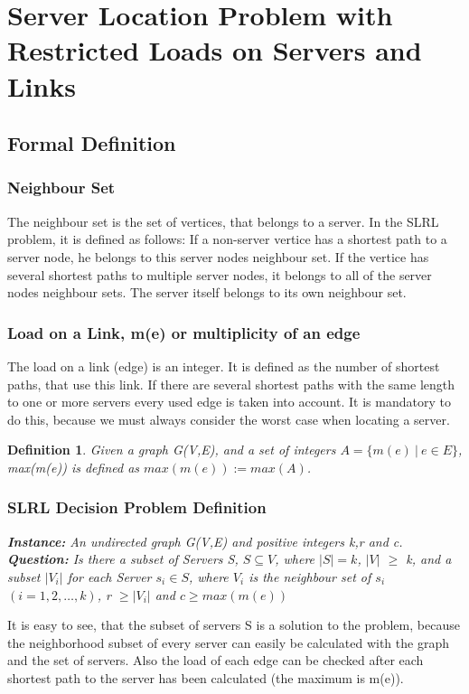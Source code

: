 \documentclass [12pt]{article}
\newtheorem{mydef}{Definition}
\begin{document}
\section{Server Location Problem with Restricted Loads on Servers and Links}
\subsection{Formal Definition}
\subsubsection{Neighbour Set}
The neighbour set is the set of vertices, that belongs to a server. In the SLRL problem, it is
defined as follows: If a non-server vertice has a shortest path to a server node, he 
belongs to this server nodes neighbour set. If the vertice has several shortest
paths to multiple server nodes, it belongs to all of the server nodes neighbour
sets. The server itself belongs to its own neighbour set.
\subsubsection{Load on a Link, m(e) or multiplicity of an edge}
The load on a link (edge) is an integer. It is defined as the number of shortest paths, that use this link. If there
are several shortest paths with the same length to one or more servers every
used edge is taken into account. It is mandatory to do this, because we must always consider
the worst case when locating a server. 
\begin{mydef}
  Given a graph G(V,E), and a set of integers $A= \{ m(e) \ | \ e \in E \}$, max(m(e)) is defined as $max(m(e)):= max(A)$.
\end{mydef}
\subsubsection{SLRL Decision Problem Definition}

{\itshape \textbf{Instance:} An undirected graph G(V,E) and  positive integers k,r and c.\\
  \textbf{Question:} 
  Is there a subset of Servers S, $S \subseteq V$, where $|S| = k$, $|V|$ $\geq$ k,
  and a subset $|V_i|$ for each Server $s_i \in S$, where $V_i$ is the neighbour set of $s_i$ $(i=1,2,\dots,k)$, r $\geq  |V_i|$ 
and $c  \geq max(m(e))$}


It is easy to see, that the subset of servers S is a solution to the problem, because the neighborhood subset
of every server can easily be calculated with the graph and the set of servers. Also the load of each edge
can be checked after each shortest path to the server has been calculated (the maximum is m(e)).
\end{document}
